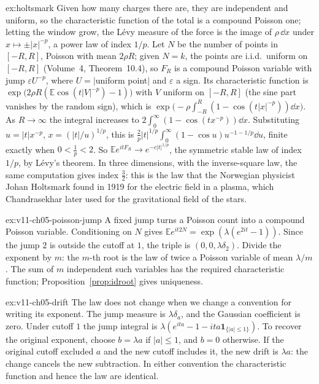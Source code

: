 \begin{solution}{ex:holtsmark}
\idea Given how many charges there are, they are independent and uniform, so the characteristic function of the total is a compound Poisson one;
letting the window grow, the L\'evy measure of the force is the image of $\rho\,\dd x$ under $x\mapsto\pm|x|^{-p}$, a power law of index $1/p$.
\writeup Let $N$ be the number of points in $[-R,R]$, Poisson with mean $2\rho R$; given $N=k$, the points are i.i.d.\ uniform on $[-R,R]$ (Volume~4, Theorem~10.4),
so $F_R$ is a compound Poisson variable with jump $\varepsilon U^{-p}$, where $U=|$uniform point$|$ and $\varepsilon$ a sign. Its characteristic function is
$\exp\bigl(2\rho R(\mathbb E\cos(t|V|^{-p})-1)\bigr)$ with $V$ uniform on $[-R,R]$ (the sine part vanishes by the random sign), which is
$\exp\bigl(-\rho\int_{-R}^R(1-\cos(t|x|^{-p}))\dd x\bigr)$. As $R\to\infty$ the integral increases to $2\int_0^\infty(1-\cos(tx^{-p}))\dd x$. Substituting $u=|t|x^{-p}$,
$x=(|t|/u)^{1/p}$, this is $\frac2p|t|^{1/p}\int_0^\infty(1-\cos u)u^{-1-1/p}\dd u$, finite exactly when $0<\frac1p<2$. So $\mathbb Ee^{itF_R}\to e^{-c|t|^{1/p}}$, the
symmetric stable law of index $1/p$, by L\'evy's theorem. In three dimensions, with the inverse-square law, the same computation gives index $\frac32$: this is
the law that the Norwegian physicist Johan Holtsmark found in 1919 for the electric field in a plasma, which Chandrasekhar later used for the gravitational
field of the stars.
\end{solution}

\begin{solution}{ex:v11-ch05-poisson-jump}
\idea A fixed jump turns a Poisson count into a compound Poisson variable.
\writeup Conditioning on $N$ gives $\mathbb E e^{it2N}=\exp(\lambda(e^{2it}-1))$. Since the jump $2$ is outside the cutoff at $1$, the triple is $(0,0,\lambda\delta_2)$. Divide the exponent by $m$: the $m$-th root is the law of twice a Poisson variable of mean $\lambda/m$. The sum of $m$ independent such variables has the required characteristic function; Proposition~\ref{prop:idroot} gives uniqueness.
\end{solution}

\begin{solution}{ex:v11-ch05-drift}
\idea The law does not change when we change a convention for writing its exponent.
\writeup The jump measure is $\lambda\delta_a$, and the Gaussian coefficient is zero. Under cutoff $1$ the jump integral is $\lambda(e^{ita}-1-ita\mathbf1_{\{|a|\le1\}})$. To recover the original exponent, choose $b=\lambda a$ if $|a|\le1$, and $b=0$ otherwise. If the original cutoff excluded $a$ and the new cutoff includes it, the new drift is $\lambda a$: the change cancels the new subtraction. In either convention the characteristic function and hence the law are identical.
\end{solution}

